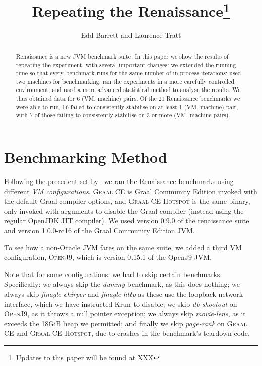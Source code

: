 \documentclass[a4paper]{article}
\newcommand{\graalce}{\textsc{Graal CE}\xspace}
\newcommand{\graalcehs}{\textsc{Graal CE Hotspot}\xspace}
\newcommand{\jnine}{\textsc{OpenJ9}\xspace}
\begin{document}
\title{Repeating the Renaissance\footnote{Updates to this paper will be found at \url{XXX}}}

\author{Edd Barrett and Laurence Tratt}

\maketitle

\begin{abstract}
Renaissance is a new JVM benchmark suite. In this paper we show the results of
repeating the experiment, with several important changes: we extended the
running time so that every benchmark runs for the same number of in-process
iterations; used two machines for benchmarking; ran the experiments in a more
carefully controlled environment; and used a more advanced statistical method
to analyse the results. We thus obtained data for 6 (VM, machine) pairs. Of the
21 Renaissance benchmarks we were able to run, 16 failed to consistently
stabilise on at least 1 (VM, machine) pair, with 7 of those failing to
consistently stabilise on 3 or more (VM, machine pairs).
\end{abstract}

\section{Benchmarking Method}
\label{sec:eval}

Following the precedent set by~\cite{prokopec19renaissance} we ran the
Renaissance benchmarks using different \emph{VM configurations}. \graalce is
Graal Community Edition invoked with the default Graal compiler options, and
\graalcehs is the same binary, only invoked with arguments to disable the Graal
compiler (instead using the regular OpenJDK JIT compiler). We used version 0.9.0
of the renaissance suite and version 1.0.0-rc16 of the Graal Community
Edition JVM.

To see how a non-Oracle JVM fares on the same suite, we added a third VM
configuration, \jnine, which is version 0.15.1 of the OpenJ9 JVM.

Note that for some configurations, we had to skip certain benchmarks.
Specifically: we always skip the \emph{dummy} benchmark, as this does nothing;
we always skip \emph{finagle-chirper} and \emph{finagle-http} as these use the
loopback network interface, which we have instructed Krun to disable; we skip
\emph{db-shootout} on \jnine, as it throws a null pointer exception; we always
skip \emph{movie-lens}, as it exceeds the 18GiB heap we permitted; and finally
we skip \emph{page-rank} on \graalce and \graalcehs, due to crashes in the
benchmark's teardown code.
\end{document}
